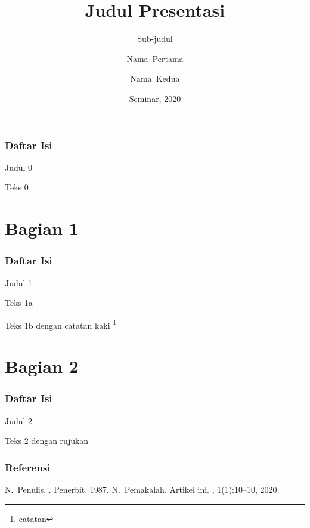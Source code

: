 \documentclass{beamer}
\title[Judul Singkat]
{Judul Presentasi}
\subtitle{Sub-judul}
\author%
{Nama~Pertama\inst{1} \and Nama~Kedua\inst{2}}
\institute[Untirta] %
{
  \inst{1}%
  Jurusan Teknik Elektro\\
  Fakultas Teknik\\
  Universitas Sultan Ageng Tirtayasa, ID
  \and
  \inst{2}%
  Institusi\\
  Tempat
}
\date[ICIEE 2020] %
{Seminar, 2020}
\begin{document}
\frame{\titlepage}


\begin{frame}
\frametitle{Daftar Isi}
\tableofcontents%
\end{frame}


\begin{frame}{Judul 0}

Teks 0
 
\end{frame}

\section[]{Bagian 1}


\begin{frame}
\frametitle{Daftar Isi}
\tableofcontents[currentsection]
\end{frame}

\begin{frame}{Judul 1}

Teks 1a

\pause

Teks 1b dengan catatan kaki \footnote{catatan}
 
\end{frame}

\section[]{Bagian 2}


\begin{frame}
\frametitle{Daftar Isi}
\tableofcontents[currentsection]
\end{frame}


\begin{frame}{Judul 2}

Teks 2 dengan rujukan \cite{Pemakalah2020}
 
\end{frame}


\begin{frame}[allowframebreaks]
  \frametitle<presentation>{Referensi}    
  \begin{thebibliography}{10}    
  \beamertemplatebookbibitems
    N.~Penulis.
    .
    \newblock Penerbit, 1987.
  \beamertemplatearticlebibitems
    N.~Pemakalah.
    \newblock Artikel ini.
    , 1(1):10--10, 2020.
  \end{thebibliography}
\end{frame}
\end{document}
